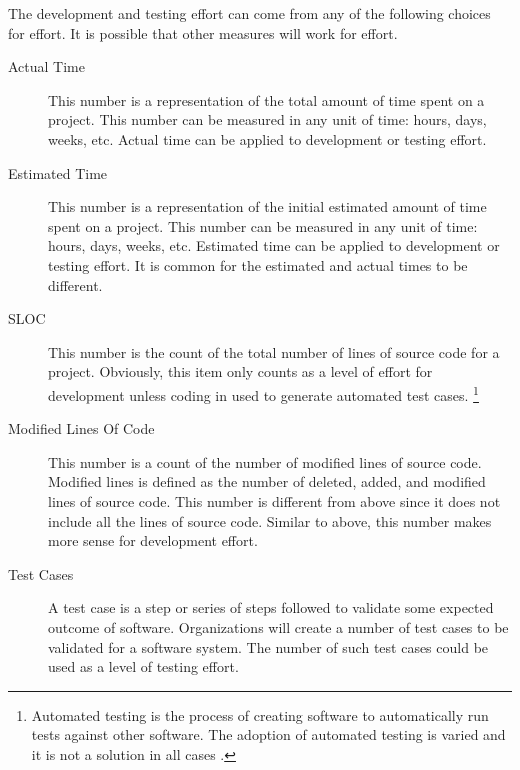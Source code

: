\documentclass[SDSUThesis.tex]{subfiles}
\begin{document}
                The development and testing effort can come from any of 
                the following choices for effort. It is possible
                that other measures will work for effort.
                \begin{description}
                    \item[Actual Time] This number is a representation of the 
                        total amount of time spent on a project.  This number
                        can be measured in any unit of time: hours, days, weeks,
                        etc.  Actual time can be applied to development or testing
                        effort.
                    \item[Estimated Time] This number is a representation of the 
                        initial estimated amount of time spent on a project.  This number
                        can be measured in any unit of time: hours, days, weeks,
                        etc.  Estimated time can be applied to development or testing
                        effort.  It is common for the estimated and actual times
                        to be different.
                    \item[SLOC]  This number is the count of 
                        the total number of lines of source code for a project. 
                        Obviously, 
                        this item only counts as a level of
                        effort for development unless coding in used to generate
                        automated test cases. \footnote{Automated testing is the
                        process of creating software to automatically run tests
                        against other software.  The adoption of automated testing
                        is varied and it is not a solution in all cases 
                        \cite{Ramler2006}. }
                    \item[Modified Lines Of Code] This number is a count of the number 
                        of modified lines of source code. Modified lines is 
                        defined as the number of deleted, added, and modified 
                        lines of source code.  This number is different from above
                        since it does not include all the lines of source code.  Similar
                        to above, this number makes more sense for development effort.
                    \item[Test Cases] A test case is a step or series of steps followed
                        to validate some expected outcome of software.  Organizations
                        will create a number of test cases to be validated for a
                        software system.  The number of such test cases could
                        be used as a level of testing effort.
                \end{description}
                
\end{document}
